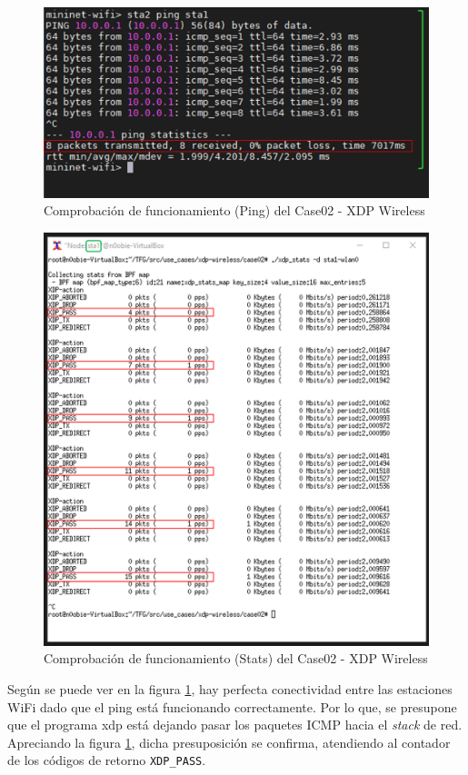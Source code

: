 \begin{figure}[ht]
    \centering
    \includegraphics[width=12cm]{archivos/img/dev/xdp-wifi/case02/demo_case02_1_edited.png}
    \caption{Comprobación de funcionamiento (Ping) del Case02 - XDP Wireless}
    \label{fig:case02_xdp_wifi_func1}
\end{figure}
\newpage
\begin{figure}[ht!]
    \centering
    \includegraphics[width=14cm]{archivos/img/dev/xdp-wifi/case02/demo_case02_2_edited.png}
    \caption{Comprobación de funcionamiento (Stats) del Case02 - XDP Wireless}
    \label{fig:case02_xdp_wifi_func2}
\end{figure}

Según se puede ver en la figura \ref{fig:case02_xdp_wifi_func1}, hay perfecta conectividad entre las estaciones WiFi dado que el ping \hspace{1mm} está funcionando correctamente. Por lo que, se presupone que el programa \gls{xdp} está dejando pasar los paquetes ICMP hacia el \textit{stack} de red. Apreciando la figura \ref{fig:case02_xdp_wifi_func1}, dicha presuposición se confirma, atendiendo al contador de los códigos de retorno \texttt{XDP\_PASS}. 